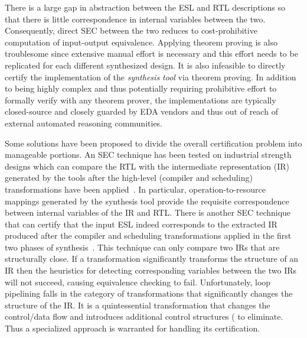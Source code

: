 There is a large gap in abstraction
between the ESL and RTL descriptions so that there is little
correspondence in internal variables between the two.  Consequently,
direct SEC between the two reduces to cost-prohibitive computation of
input-output equivalence. Applying theorem proving
is also troublesome since extensive manual effort is necessary and
this effort needs to be replicated for each different synthesized
design. It is also infeasible to
directly certify the implementation of the {\em synthesis tool} via
theorem proving.  In addition to being highly complex and thus
potentially requiring prohibitive effort to formally verify with any
theorem prover, the implementations are typically closed-source and
closely guarded by EDA vendors and thus out of reach of external
automated reasoning communities.

Some solutions have been proposed to divide the overall certification problem into manageable portions.
An SEC technique has been tested on industrial strength designs which can compare the RTL 
with the intermediate representation (IR) generated by the tools after the high-level (compiler and scheduling)
transformations have been applied~\cite{rhcxy:atva-09,hxry:date-10}.  In particular,
operation-to-resource mappings generated by the synthesis
tool provide the requisite correspondence between internal
variables of the IR and RTL. There is another SEC technique that 
can certify that the input ESL indeed corresponds to the extracted 
IR produced after the compiler and scheduling transformations applied in the
first two phases of synthesis~\cite{zhenkun:iccd-13}. This technique
can only compare two IRs that are structurally close.  If a
transformation significantly transforms the structure of an IR then
the heuristics for detecting corresponding variables between the two
IRs will not succeed, causing equivalence checking to fail.
Unfortunately, loop pipelining falls in the category of
transformations that significantly changes the structure of the IR.
It is a quintessential transformation that changes the control/data
flow and introduces additional control structures (%
to eliminate. Thus a specialized approach is warranted for
handling its certification.

